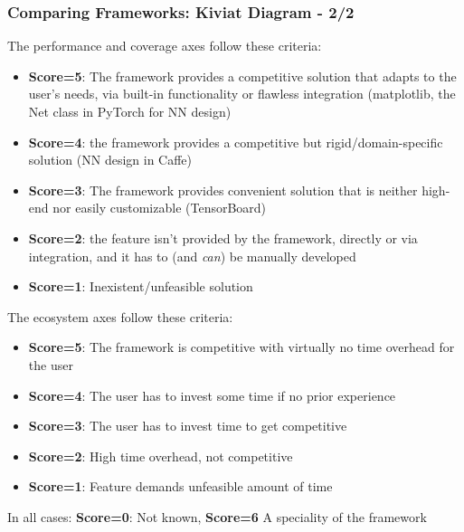 \documentclass[hyperref={pdfpagelabels=false}]{beamer}
\begin{document}
\begin{frame}
  \frametitle{Comparing Frameworks: Kiviat Diagram - 2/2}
  \vspace{-2mm}
  \small{The \textcolor{visiblered}{performance} and \textcolor{visiblegreen}{coverage} axes follow these criteria}:
  \begin{itemize}
  \item \scriptsize{\textbf{Score=5}: The framework provides a competitive solution that adapts to the user's needs, via built-in functionality or flawless integration (matplotlib,  the Net class in PyTorch for NN design)}
  \item \scriptsize{\textbf{Score=4}: the framework provides a competitive but rigid/domain-specific solution (NN design in Caffe)}
  \item \scriptsize{\textbf{Score=3}: The framework provides convenient solution that is neither high-end nor easily customizable (TensorBoard)}
  \item \scriptsize{\textbf{Score=2}: the feature isn't provided by the framework, directly or via integration, and it has to (and \textit{can}) be manually developed}
  \item \scriptsize{\textbf{Score=1}: Inexistent/unfeasible solution}
  \end{itemize}
  \vspace{-1mm}
  \small{The \textcolor{visibleblue}{ecosystem} axes follow these criteria}:
  \begin{itemize}
  \item \scriptsize{\textbf{Score=5}: The framework is competitive with virtually no time overhead for the user}
  \item \scriptsize{\textbf{Score=4}: The user has to invest some time if no prior experience}
  \item \scriptsize{\textbf{Score=3}: The user has to invest time to get competitive}
  \item \scriptsize{\textbf{Score=2}: High time overhead, not competitive}
  \item \scriptsize{\textbf{Score=1}: Feature demands unfeasible amount of time}
  \end{itemize}
  \small{In all cases: \textbf{Score=0}: Not known, \textbf{Score=6} A speciality of the framework}
\end{frame}
\end{document}

